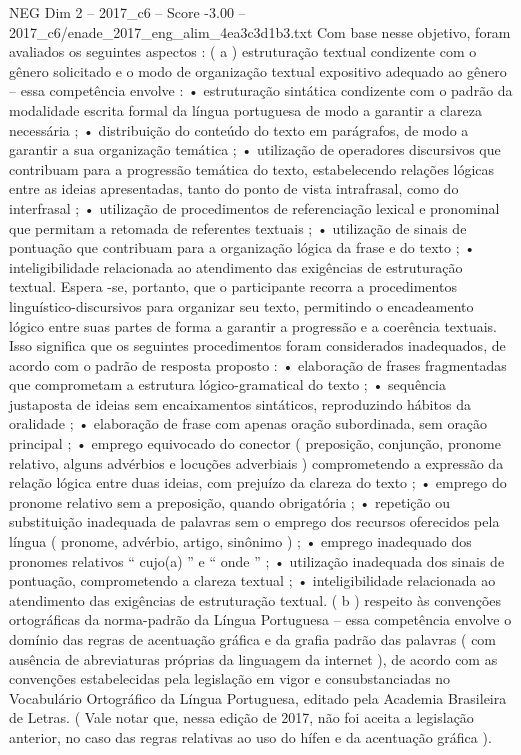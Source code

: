 \begin{textsample}{NEG Dim 2 – 2017\_c6 – Score -3.00 – 2017\_c6/enade\_2017\_eng\_alim\_4ea3c3d1b3.txt}
Com base nesse objetivo, foram avaliados os seguintes aspectos : ( a ) estruturação textual condizente com o gênero solicitado e o modo de organização textual expositivo adequado ao gênero – essa competência envolve : • estruturação sintática condizente com o padrão da modalidade escrita formal da língua portuguesa de modo a garantir a clareza necessária ; • distribuição do conteúdo do texto em parágrafos, de modo a garantir a sua organização temática ; • utilização de operadores discursivos que contribuam para a progressão temática do texto, estabelecendo relações lógicas entre as ideias apresentadas, tanto do ponto de vista intrafrasal, como do interfrasal ; • utilização de procedimentos de referenciação lexical e pronominal que permitam a retomada de referentes textuais ; • utilização de sinais de pontuação que contribuam para a organização lógica da frase e do texto ; • inteligibilidade relacionada ao atendimento das exigências de estruturação textual.
Espera -se, portanto, que o participante recorra a procedimentos linguístico-discursivos para organizar seu texto, permitindo o encadeamento lógico entre suas partes de forma a garantir a progressão e a coerência textuais.
Isso significa que os seguintes procedimentos foram considerados inadequados, de acordo com o padrão de resposta proposto : • elaboração de frases fragmentadas que comprometam a estrutura lógico-gramatical do texto ; • sequência justaposta de ideias sem encaixamentos sintáticos, reproduzindo hábitos da oralidade ; • elaboração de frase com apenas oração subordinada, sem oração principal ; • emprego equivocado do conector ( preposição, conjunção, pronome relativo, alguns advérbios e locuções adverbiais ) comprometendo a expressão da relação lógica entre duas ideias, com prejuízo da clareza do texto ; • emprego do pronome relativo sem a preposição, quando obrigatória ; • repetição ou substituição inadequada de palavras sem o emprego dos recursos oferecidos pela língua ( pronome, advérbio, artigo, sinônimo ) ; • emprego inadequado dos pronomes relativos “ cujo(a) ” e “ onde ” ; • utilização inadequada dos sinais de pontuação, comprometendo a clareza textual ; • inteligibilidade relacionada ao atendimento das exigências de estruturação textual. ( b ) respeito às convenções ortográficas da norma-padrão da Língua Portuguesa – essa competência envolve o domínio das regras de acentuação gráfica e da grafia padrão das palavras ( com ausência de abreviaturas próprias da linguagem da internet ), de acordo com as convenções estabelecidas pela legislação em vigor e consubstanciadas no Vocabulário Ortográfico da Língua Portuguesa, editado pela Academia Brasileira de Letras. ( Vale notar que, nessa edição de 2017, não foi aceita a legislação anterior, no caso das regras relativas ao uso do hífen e da acentuação gráfica ).

\end{textsample}
